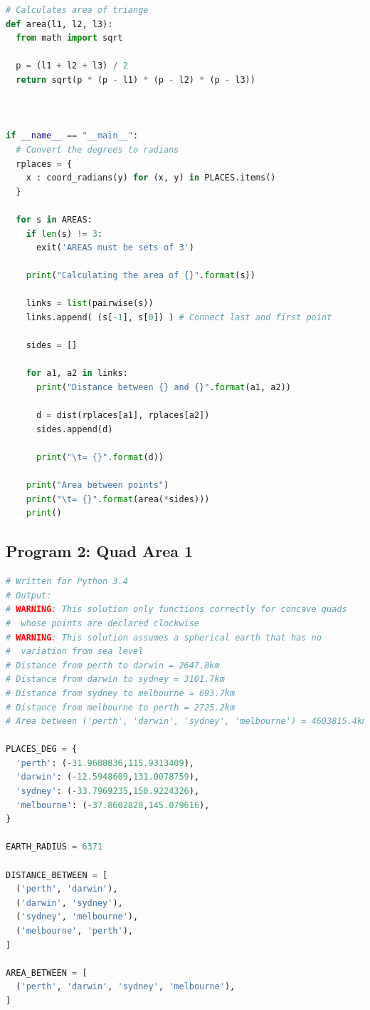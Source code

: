 \documentclass[a4paper,10pt]{article}
\begin{document}
\begin{appendices}
\begin{lstlisting}[language=Python]
# Calculates area of triange
def area(l1, l2, l3):
  from math import sqrt

  p = (l1 + l2 + l3) / 2
  return sqrt(p * (p - l1) * (p - l2) * (p - l3))



if __name__ == "__main__":
  # Convert the degrees to radians
  rplaces = {
    x : coord_radians(y) for (x, y) in PLACES.items()
  }

  for s in AREAS:
    if len(s) != 3:
      exit('AREAS must be sets of 3')

    print("Calculating the area of {}".format(s))

    links = list(pairwise(s))
    links.append( (s[-1], s[0]) ) # Connect last and first point

    sides = []

    for a1, a2 in links:
      print("Distance between {} and {}".format(a1, a2))

      d = dist(rplaces[a1], rplaces[a2])
      sides.append(d)

      print("\t= {}".format(d))

    print("Area between points")
    print("\t= {}".format(area(*sides)))
    print()
  \end{lstlisting}
  
  \clearpage
  \subsection{Program 2: Quad Area 1}
  \begin{lstlisting}[language=Python]
# Written for Python 3.4
# Output:
# WARNING: This solution only functions correctly for concave quads 
#  whose points are declared clockwise
# WARNING: This solution assumes a spherical earth that has no 
#  variation from sea level
# Distance from perth to darwin = 2647.8km
# Distance from darwin to sydney = 3101.7km
# Distance from sydney to melbourne = 693.7km
# Distance from melbourne to perth = 2725.2km
# Area between ('perth', 'darwin', 'sydney', 'melbourne') = 4603815.4km^2

PLACES_DEG = {
  'perth': (-31.9688836,115.9313409),
  'darwin': (-12.5948609,131.0078759),
  'sydney': (-33.7969235,150.9224326),
  'melbourne': (-37.8602828,145.079616),
}

EARTH_RADIUS = 6371

DISTANCE_BETWEEN = [
  ('perth', 'darwin'),
  ('darwin', 'sydney'),
  ('sydney', 'melbourne'),
  ('melbourne', 'perth'),
]

AREA_BETWEEN = [
  ('perth', 'darwin', 'sydney', 'melbourne'),
]



\end{lstlisting}
\end{appendices}
\end{document}
